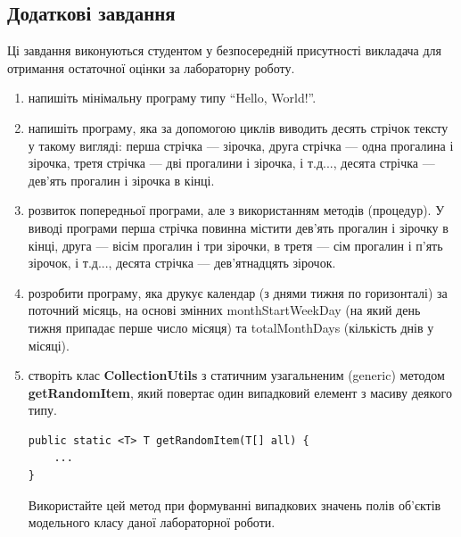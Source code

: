 \subsection{Додаткові завдання}
Ці завдання виконуються студентом у безпосередній присутності викладача для отримання остаточної оцінки за лабораторну роботу.
\begin{enumerate}
\item напишіть мінімальну програму типу ``Hello, World!''.
\item напишіть програму, яка за допомогою циклів виводить десять стрічок тексту у такому вигляді: перша стрічка --- зірочка, друга стрічка --- одна прогалина і зірочка, третя стрічка --- дві прогалини і зірочка, і т.д..., десята стрічка --- дев’ять прогалин і зірочка в кінці.
\item розвиток попередньої програми, але з використанням методів (процедур). У виводі програми перша стрічка повинна містити дев’ять прогалин і зірочку в кінці, друга --- вісім прогалин і три зірочки, в третя --- сім прогалин і п’ять зірочок, і т.д..., десята стрічка --- дев’ятнадцять зірочок.
\item розробити програму, яка друкує календар (з днями тижня по горизонталі) 
за поточний місяць, на основі змінних monthStartWeekDay (на який день тижня
припадає перше число місяця) та totalMonthDays (кількість днів у місяці).
\item створіть клас {\bf CollectionUtils} з статичним узагальненим 
(generic) методом {\bf getRandomItem}, який повертає один випадковий 
елемент з масиву деякого типу. 
\begin{lstlisting}
public static <T> T getRandomItem(T[] all) {
    ...
}
\end{lstlisting}
Використайте цей метод при формуванні випадкових значень полів об’єктів 
модельного класу даної лабораторної роботи.


\end{enumerate}
